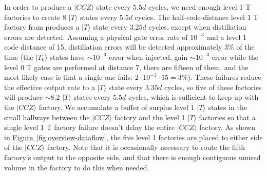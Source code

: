 \documentclass[superscriptaddress,notitlepage,longbibliography]{revtex4-1}
\newcommand{\fig}[1]{\hyperref[fig:#1]{Figure~\ref*{fig:#1}}}
\begin{document}
In order to produce a $|CCZ\rangle$ state every $5.5d$ cycles, we need enough level 1 T factories to create 8 $|T\rangle$ states every $5.5d$ cycles.
The half-code-distance level 1 T factory from \cite{fowler2018} produces a $|T\rangle$ state every $3.25d$ cycles, except when distillation errors are detected.
Assuming a physical gate error rate of $10^{-3}$ and a level 1 code distance of 15, distillation errors will be detected approximately 3\% of the time (the $|T_0\rangle$ states have $\sim 10^{-3}$ error when injected, gain $\sim 10^{-3}$ error while the level 0 T gates are performed at distance 7, there are fifteen of them, and the most likely case is that a single one fails: $2 \cdot 10^{-3} \cdot 15 = 3\%$).
These failures reduce the effective output rate to a $|T\rangle$ state every $3.35d$ cycles, so five of these factories will produce $\sim 8.2$ $|T\rangle$ states every $5.5d$ cycles, which is sufficient to keep up with the $|CCZ\rangle$ factory.
We accumulate a buffer of surplus level 1 $|T\rangle$ states in the small hallways between the $|CCZ\rangle$ factory and the level 1 $|T\rangle$ factories so that a single level 1 T factory failure doesn't delay the entire $|CCZ\rangle$ factory.
As shown in \fig{overview-dataflow}, the five level 1 factories are placed to either side of the $|CCZ\rangle$ factory.
Note that it is occasionally necessary to route the fifth factory's output to the opposite side, and that there is enough contiguous unused volume in the factory to do this when needed.
\end{document}
